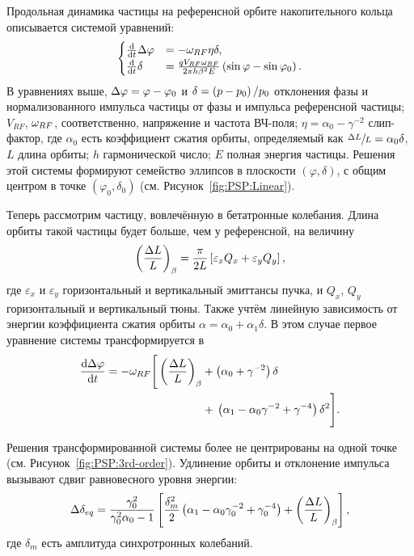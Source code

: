 Продольная динамика частицы на референсной орбите накопительного кольца описывается
системой уравнений:
\begin{equation}
\begin{cases}
\ddt{}\D\varphi &= -\w_{RF}\eta\delta, \\
\ddt{}\delta &= \frac{q V_{RF}\w_{RF}}{2\pi h\beta^2E}\bkt{\sin\varphi - \sin\varphi_0}.
\end{cases}
\end{equation}
В уравнениях выше, $\Delta\varphi = \varphi - \varphi_0$ и
$\delta = \bkt{p-p_0}/{p_0}$ отклонения фазы и нормализованного импульса частицы
от фазы и импульса референсной частицы;
 $V_{RF}$, $\omega_{RF}$, соответственно,
 напряжение и частота ВЧ-поля; $\eta = \alpha_0 - \gamma^{-2}$ слип-фактор,
 где $\alpha_0$ есть коэффициент сжатия орбиты, определяемый как $\sfrac{\Delta L}{L} = \alpha_0\delta$,
 $L$ длина орбиты; $h$ гармонической число; $E$ полная энергия частицы.
Решения этой системы формируют семейство эллипсов в плоскости $(\varphi, \delta)$, с общим центром в
точке $(\varphi_0,\delta_0)$ (см. Рисунок~\ref{fig:PSP:Linear}). 

Теперь рассмотрим частицу, вовлечённую в бетатронные колебания. Длина орбиты такой частицы будет больше,
 чем у референсной, на величину 
\begin{equation}\label{eq:betatron_OL}
\bkt{\frac{\Delta L}{L}}_\beta = \frac{\pi}{2L}\bkt*{\varepsilon_xQ_x + \varepsilon_yQ_y},
\end{equation}
где  $\varepsilon_x$ и $\varepsilon_y$ 
горизонтальный и вертикальный эмиттансы пучка, и $Q_x$, $Q_y$ горизонтальный и вертикальный тюны.
Также учтём линейную зависимость от энергии коэффициента сжатия орбиты 
${\alpha = \alpha_0 + \alpha_1\delta}$. 
В этом случае первое уравнение системы трансформируется в~\cite[p.~2579]{Senichev:IPAC13}
\begin{align*}
\ddt{\D\varphi} = -\w_{RF} \Bigg[\bkt{\frac{\Delta L}{L}}_\beta &+ \bkt{\alpha_0 + \gamma^{-2}}\delta \Bigg.\\
&+ \Bigg.\bkt{\alpha_1 - \alpha_0\gamma^{-2} + \gamma^{-4}}\delta^2\Bigg].
\end{align*}

Решения трансформированной системы более не центрированы на одной точке (см. Рисунок~\ref{fig:PSP:3rd-order}). Удлинение орбиты
и отклонение импульса вызывают сдвиг равновесного уровня энергии:~\cite[p.~2581]{Senichev:IPAC13}
\begin{equation}\label{eq:EquLevMom_shift}
\Delta\delta_{eq} = \frac{\gamma_0^2}{\gamma_0^2\alpha_0 - 1}\bkt*{\frac{\delta_m^2}{2}\bkt{\alpha_1 - \alpha_0\gamma_0^{-2} + \gamma_0^{-4}} + \bkt{\frac{\Delta L}{L}}_\beta},
\end{equation}
где $\delta_m$ есть амплитуда синхротронных колебаний.

